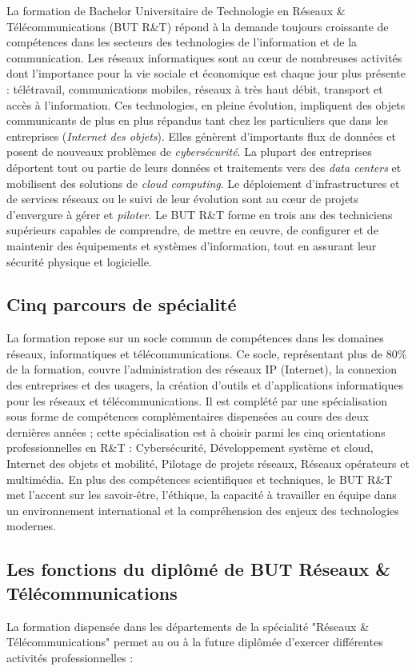 La formation de Bachelor Universitaire de Technologie en Réseaux \& Télécommunications  (BUT R\&T) répond à la demande toujours croissante de compétences dans les secteurs  des technologies de l'information et de la communication. Les réseaux informatiques sont au cœur de nombreuses activités dont l'importance pour la vie sociale et économique est chaque jour plus présente : télétravail, communications mobiles, réseaux à très haut débit, transport et accès à l'information. Ces technologies, en pleine évolution, impliquent des objets communicants  de plus en plus répandus tant chez les particuliers que dans les entreprises ({\em Internet des objets}). Elles génèrent d'importants flux de données et posent de nouveaux problèmes de {\em cybersécurité}. La plupart des entreprises déportent tout ou partie de leurs données et traitements vers des {\em data centers} et mobilisent des solutions de {\em cloud computing}. Le déploiement d'infrastructures et de services réseaux ou le suivi de leur évolution sont au cœur de projets d'envergure à gérer et {\em piloter}.  Le BUT R\&T forme en trois ans des techniciens supérieurs capables de comprendre, de mettre en œuvre, de  configurer et de maintenir des équipements et systèmes d'information, tout en assurant leur sécurité physique et logicielle. 

\subsection*{Cinq parcours de spécialité}
La formation repose sur un socle commun de compétences dans les domaines réseaux, informatiques et télécommunications. Ce socle, représentant plus de 80\% de la formation, couvre l'administration des réseaux IP (Internet), la connexion des entreprises et des usagers, la création d'outils et d'applications informatiques pour les réseaux et télécommunications. Il est complété par une spécialisation sous forme de compétences complémentaires dispensées au cours des deux dernières années ; cette spécialisation est à choisir parmi les cinq orientations professionnelles en R\&T : Cybersécurité, Développement système et cloud, Internet des objets et mobilité, Pilotage de projets réseaux, Réseaux opérateurs et multimédia. En plus des compétences scientifiques et techniques, le BUT R\&T met l'accent sur les savoir-être, l'éthique, la capacité à travailler en équipe dans un environnement international et la compréhension des enjeux des technologies modernes.

\subsection*{Les fonctions du diplômé de BUT Réseaux \& Télécommunications}
La formation dispensée dans les départements de la spécialité "Réseaux \& Télécommunications" permet au ou à la future diplômée d'exercer différentes activités professionnelles :

